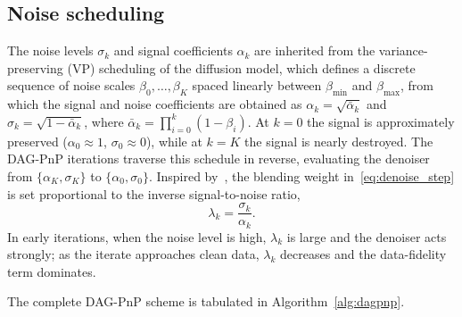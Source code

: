 \documentclass[conference]{IEEEtran}
\newcommand{\nz}[1]{{\color{red}{[Nicolas: #1]}}}
\begin{document}
	\subsection{Noise scheduling}
    \label{ssec:noise_schedule}
    The noise levels $\sigma_k$ and signal coefficients $\alpha_k$ 
    are inherited from the variance-preserving (VP) scheduling of 
    the diffusion model, which defines a discrete sequence of noise scales $\beta_0, \ldots, \beta_K$ spaced linearly between $\beta_{\min}$ and $\beta_{\max}$, from which the signal and noise coefficients are obtained as $\alpha_k = \sqrt{\bar{\alpha}_k}$ and 
    $\sigma_k = \sqrt{1 - \bar{\alpha}_k}$, where $\bar{\alpha}_k = \prod_{i=0}^{k}(1 - \beta_i)$. 
    At $k=0$ the signal is approximately preserved ($\alpha_0 \approx 1$, $\sigma_0 \approx 0$), while at $k=K$ the signal is nearly destroyed.
    The DAG-PnP iterations traverse this schedule in reverse, evaluating the denoiser from $\{\alpha_K, \sigma_K\}$ to $\{\alpha_0, \sigma_0\}$. Inspired by~\cite{mardani2023variational}, the blending weight in~\eqref{eq:denoise_step} is set proportional to the inverse signal-to-noise ratio,
    \begin{equation}\label{eq:lambda_schedule}
        \lambda_k = \frac{\sigma_k}{\alpha_k}.
    \end{equation}
    In early iterations, when the noise level is high, $\lambda_k$ is large and the denoiser acts strongly; as the iterate approaches clean data, $\lambda_k$ decreases and the data-fidelity term dominates.

    The complete DAG-PnP scheme is tabulated in Algorithm~\ref{alg:dagpnp}.
    
	
\end{document}
